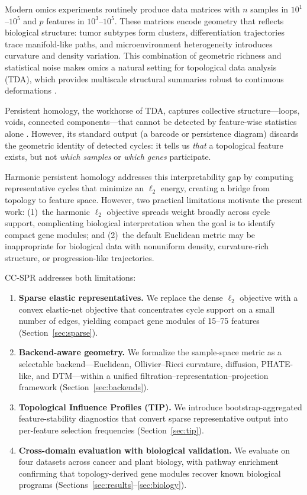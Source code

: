 \documentclass[11pt]{article}
\begin{document}
Modern omics experiments routinely produce data matrices with $n$ samples in $10^1$--$10^5$ and $p$ features in $10^3$--$10^5$.
These matrices encode geometry that reflects biological structure: tumor subtypes form clusters, differentiation trajectories trace manifold-like paths, and microenvironment heterogeneity introduces curvature and density variation.
This combination of geometric richness and statistical noise makes omics a natural setting for topological data analysis (TDA), which provides multiscale structural summaries robust to continuous deformations \cite{carlsson2009}.

Persistent homology, the workhorse of TDA, captures collective structure---loops, voids, connected components---that cannot be detected by feature-wise statistics alone \cite{edelsbrunner2010}.
However, its standard output (a barcode or persistence diagram) discards the geometric identity of detected cycles: it tells us \emph{that} a topological feature exists, but not \emph{which samples} or \emph{which genes} participate.

Harmonic persistent homology \cite{harmonicPH, damiani2024} addresses this interpretability gap by computing representative cycles that minimize an $\ell_2$ energy, creating a bridge from topology to feature space.
However, two practical limitations motivate the present work:
(1)~the harmonic $\ell_2$ objective spreads weight broadly across cycle support, complicating biological interpretation when the goal is to identify compact gene modules; and
(2)~the default Euclidean metric may be inappropriate for biological data with nonuniform density, curvature-rich structure, or progression-like trajectories.

CC-SPR addresses both limitations:
\begin{enumerate}[leftmargin=1.5em]
\item \textbf{Sparse elastic representatives.} We replace the dense $\ell_2$ objective with a convex elastic-net objective that concentrates cycle support on a small number of edges, yielding compact gene modules of 15--75 features (Section~\ref{sec:sparse}).
\item \textbf{Backend-aware geometry.} We formalize the sample-space metric as a selectable backend---Euclidean, Ollivier--Ricci curvature, diffusion, PHATE-like, and DTM---within a unified filtration--representation--projection framework (Section~\ref{sec:backends}).
\item \textbf{Topological Influence Profiles (TIP).} We introduce bootstrap-aggregated feature-stability diagnostics that convert sparse representative output into per-feature selection frequencies (Section~\ref{sec:tip}).
\item \textbf{Cross-domain evaluation with biological validation.} We evaluate on four datasets across cancer and plant biology, with pathway enrichment confirming that topology-derived gene modules recover known biological programs (Sections~\ref{sec:results}--\ref{sec:biology}).
\end{enumerate}
\end{document}
